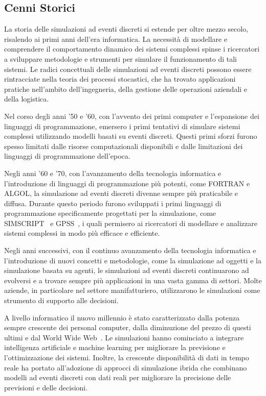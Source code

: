\documentclass[12pt,a4paper,openright,twoside]{book}
\begin{document}
\subsection{Cenni Storici}
La storia delle simulazioni ad eventi discreti si estende per oltre mezzo secolo, risalendo ai primi anni dell'era informatica. La necessità di modellare e comprendere il comportamento dinamico dei sistemi complessi spinse i ricercatori a sviluppare metodologie e strumenti per simulare il funzionamento di tali sistemi.
Le radici concettuali delle simulazioni ad eventi discreti possono essere rintracciate nella teoria dei processi stocastici, che ha trovato applicazioni pratiche nell'ambito dell'ingegneria, della gestione delle operazioni aziendali e della logistica. 

Nel corso degli anni '50 e '60, con l'avvento dei primi computer e l'espansione dei linguaggi di programmazione, emersero i primi tentativi di simulare sistemi complessi utilizzando modelli basati su eventi discreti. Questi primi sforzi furono spesso limitati dalle risorse computazionali disponibili e dalle limitazioni dei linguaggi di programmazione dell'epoca.

Negli anni '60 e '70, con l'avanzamento della tecnologia informatica e l'introduzione di linguaggi di programmazione più potenti, come FORTRAN e ALGOL, la simulazione ad eventi discreti divenne sempre più praticabile e diffusa. Durante questo periodo furono sviluppati i primi linguaggi di programmazione specificamente progettati per la simulazione, come SIMSCRIPT~\cite{DBLP:journals/ibmsj/DimsdaleM64} e GPSS~\cite{DBLP:journals/tssc/HollandM68}, i quali permisero ai ricercatori di modellare e analizzare sistemi complessi in modo più efficace e efficiente.

Negli anni successivi, con il continuo avanzamento della tecnologia informatica e l'introduzione di nuovi concetti e metodologie, come la simulazione ad oggetti e la simulazione basata su agenti, le simulazioni ad eventi discreti continuarono ad evolversi e a trovare sempre più applicazioni in una vasta gamma di settori. 
Molte aziende, in particolare nel settore manifatturiero, utilizzarono le simulazioni come strumento di supporto alle decisioni. 

A livello informatico il nuovo millennio è stato caratterizzato dalla potenza sempre crescente dei personal computer, dalla diminuzione del prezzo di questi ultimi e dal World Wide Web~\cite{DBLP:journals/jors/Robinson05}. Le simulazioni hanno cominciato a integrare intelligenza artificiale e machine learning per migliorare la previsione e l'ottimizzazione dei sistemi. Inoltre, la crescente disponibilità di dati in tempo reale ha portato all'adozione di approcci di simulazione ibrida che combinano modelli ad eventi discreti con dati reali per migliorare la precisione delle previsioni e delle decisioni.
\end{document}
